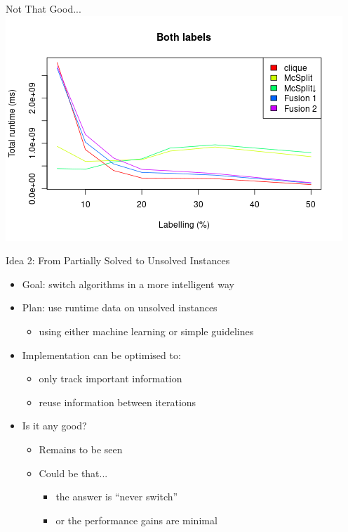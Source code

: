 \documentclass{beamer}
\begin{document}
\begin{frame}{Not That Good...}
  \centering
  \includegraphics[scale=0.5]{../dissertation/images/fusion_linechart.png}
\end{frame}

\begin{frame}{Idea 2: From Partially Solved to Unsolved Instances}
\begin{itemize}
\item Goal: switch algorithms in a more intelligent way
\item Plan: use runtime data on unsolved instances
  \begin{itemize}
  \item using either machine learning or simple guidelines
  \end{itemize}
  \pause
\item Implementation can be optimised to:
  \begin{itemize}
  \item only track important information
  \item reuse information between iterations
  \end{itemize}
  \pause
\item Is it any good?
  \pause
  \begin{itemize}
  \item Remains to be seen
  \item Could be that...
    \pause
    \begin{itemize}
    \item the answer is ``never switch''
    \item or the performance gains are minimal
    \end{itemize}
  \end{itemize}
\end{itemize}
\end{frame}
\end{document}
